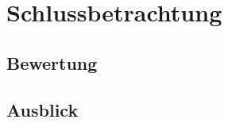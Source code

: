 \chapter{Schlussbetrachtung}
\label{chap:schlussbetrachtung}

\section{Bewertung}
\label{sec:bewertung}

\section{Ausblick}
\label{sec:ausblick}
